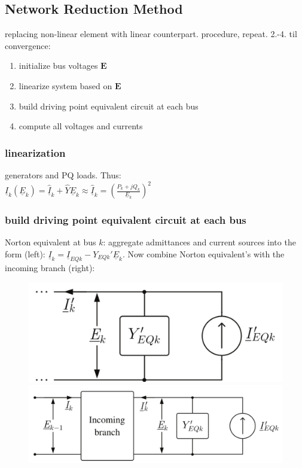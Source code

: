 \documentclass[a4paper,10pt,landscape]{scrartcl}
\begin{document}
\begin{multicols*}{3}
\subsection{Network Reduction Method}\label{Network Reduction Method}
replacing non-linear element with linear counterpart. procedure, repeat. 2.-4. til convergence:
\begin{enumerate}
    \item initialize bus voltages $\mathbf{E}$
    \item linearize system based on $\mathbf{E}$
    \item build driving point equivalent circuit at each bus
    \item compute all voltages and currents
\end{enumerate}
\subsubsection{linearization} 
generators and PQ loads. Thus: \\ 
$\underline{I}_k(\underline{E}_k) = \hat{\underline{I}}_k+\hat{Y}\underline{E}_k\approx \hat{\underline{I}}_k=\left(\frac{P_k+jQ_k}{\underline{E}_k}\right)^2$ \\
\subsubsection{build driving point equivalent circuit at each bus}
Norton equivalent at bus $k$: aggregate admittances and current sources into the form (left): $\underline{I}_k = \underline{I}_{EQk} - Y_{EQk}'\underline{E}_k$.
Now combine Norton equivalent's with the incoming branch (right): \\
\begin{figure}[H]
    \centering
    \includegraphics[width=.49\linewidth]{src/norton.png}
    \includegraphics[width=.49\linewidth]{src/incoming_branch.png}
\end{figure}
    

\end{multicols*}
\end{document}
